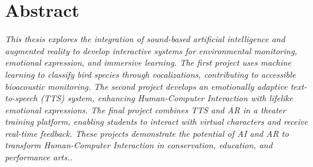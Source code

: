 \vspace*{\fill}

\section*{Abstract}
\textit{This thesis explores the integration of sound-based artificial intelligence and augmented reality to develop interactive systems for environmental monitoring, emotional expression, and immersive learning. The first project uses machine learning to classify bird species through vocalizations, contributing to accessible bioacoustic monitoring. The second project develops an emotionally adaptive text-to-speech (TTS) system, enhancing Human-Computer Interaction with lifelike emotional expressions. The final project combines TTS and AR in a theater training platform, enabling students to interact with virtual characters and receive real-time feedback. These projects demonstrate the potential of AI and AR to transform Human-Computer Interaction in conservation, education, and performance arts..}
\vspace*{\fill}
